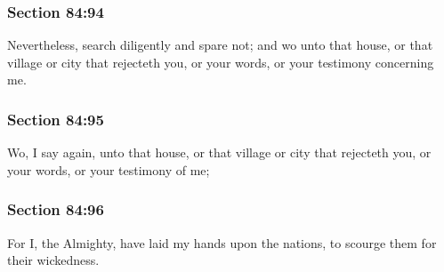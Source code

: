 	\subsubsection{Section 84:94} %
		\label{DC84-94}

		Nevertheless, search diligently and spare not; and wo unto that house, or that village or city that rejecteth you, or your words, or your testimony concerning me.


	\subsubsection{Section 84:95} %
		\label{DC84-95}

		Wo, I say again, unto that house, or that village or city that rejecteth you, or your words, or your testimony of me;


	\subsubsection{Section 84:96} %
		\label{DC84-96}

		For I, the Almighty, have laid my hands upon the nations, to scourge them for their wickedness.


